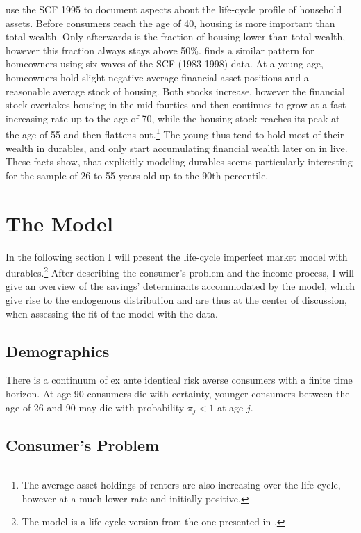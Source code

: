 \documentclass[a4paper,12pt,legno]{article}
\begin{document}
\cite{FV&K2011} use the SCF 1995 to document aspects about the life-cycle profile of household assets. Before consumers reach the age of 40, housing is more important than total wealth. Only afterwards is the fraction of housing lower than total wealth, however this fraction always stays above 50\%. \citep{yang2009} finds a similar pattern for  homeowners using six waves of the SCF (1983-1998) data. At a young age,  homeowners hold slight negative average financial asset positions and a reasonable average stock of housing. Both stocks increase, however the financial stock overtakes housing in the mid-fourties and then continues to grow at a fast-increasing rate up to the age of 70, while the housing-stock reaches its peak at the age of 55 and then flattens out.\footnote{The average asset holdings of renters are also increasing over the life-cycle, however at a much lower rate and initially positive.} The young thus tend to hold most of their wealth in durables, and only start accumulating financial wealth later on in live.
\\ These facts show, that explicitly modeling durables seems particularly interesting for the sample of 26 to 55 years old up to the 90th percentile.

\section{The Model}
\label{model}
In the following section I will present the life-cycle imperfect market model with durables.\footnote{The model is a life-cycle version from the one presented in \cite{hintermaier2010}.} After describing the consumer's problem and the income process, I will give an overview  of the savings' determinants accommodated by the model, which give rise to the endogenous distribution and are thus at the center of discussion, when assessing the fit of the model with the data.

\subsection{Demographics}
There is a continuum of ex ante identical risk averse consumers with a finite time horizon. At age 90 consumers die with certainty, younger consumers between the age of 26 and 90 may die with probability $\pi_{j} < 1$ at age $j$.
\subsection{Consumer's Problem} 
\end{document}
